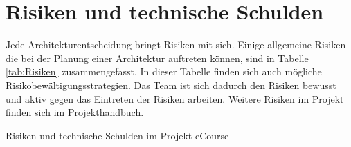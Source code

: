 \chapter{Risiken und technische Schulden}
Jede Architekturentscheidung bringt Risiken mit sich. Einige allgemeine Risiken die bei der Planung einer Architektur auftreten können, sind in Tabelle \ref{tab:Risiken} zusammengefasst. In dieser Tabelle finden sich auch mögliche Risikobewältigungsstrategien. Das Team ist sich dadurch den Risiken bewusst und aktiv gegen das Eintreten der Risiken arbeiten. Weitere Risiken im Projekt finden sich im Projekthandbuch.

\begin{table}
\centering

\caption{Risiken und technische Schulden im Projekt eCourse}
\label{tab:Risiken}
\end{table}
